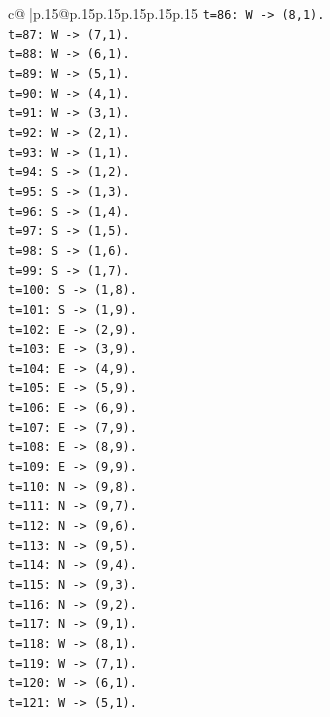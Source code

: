 \documentclass{article}
\begin{document}
{\begin{supertabular}{c@{$\;$}|p{.15\linewidth}@{}p{.15\linewidth}p{.15\linewidth}p{.15\linewidth}p{.15\linewidth}p{.15\linewidth}}
{{{\texttt{t=86: W {-}> (8,1).} \\
\texttt{t=87: W {-}> (7,1).} \\
\texttt{t=88: W {-}> (6,1).} \\
\texttt{t=89: W {-}> (5,1).} \\
\texttt{t=90: W {-}> (4,1).} \\
\texttt{t=91: W {-}> (3,1).} \\
\texttt{t=92: W {-}> (2,1).} \\
\texttt{t=93: W {-}> (1,1).} \\
\texttt{t=94: S {-}> (1,2).} \\
\texttt{t=95: S {-}> (1,3).} \\
\texttt{t=96: S {-}> (1,4).} \\
\texttt{t=97: S {-}> (1,5).} \\
\texttt{t=98: S {-}> (1,6).} \\
\texttt{t=99: S {-}> (1,7).} \\
\texttt{t=100: S {-}> (1,8).} \\
\texttt{t=101: S {-}> (1,9).} \\
\texttt{t=102: E {-}> (2,9).} \\
\texttt{t=103: E {-}> (3,9).} \\
\texttt{t=104: E {-}> (4,9).} \\
\texttt{t=105: E {-}> (5,9).} \\
\texttt{t=106: E {-}> (6,9).} \\
\texttt{t=107: E {-}> (7,9).} \\
\texttt{t=108: E {-}> (8,9).} \\
\texttt{t=109: E {-}> (9,9).} \\
\texttt{t=110: N {-}> (9,8).} \\
\texttt{t=111: N {-}> (9,7).} \\
\texttt{t=112: N {-}> (9,6).} \\
\texttt{t=113: N {-}> (9,5).} \\
\texttt{t=114: N {-}> (9,4).} \\
\texttt{t=115: N {-}> (9,3).} \\
\texttt{t=116: N {-}> (9,2).} \\
\texttt{t=117: N {-}> (9,1).} \\
\texttt{t=118: W {-}> (8,1).} \\
\texttt{t=119: W {-}> (7,1).} \\
\texttt{t=120: W {-}> (6,1).} \\
\texttt{t=121: W {-}> (5,1).} \\
}}}
\end{supertabular}}
\end{document}
